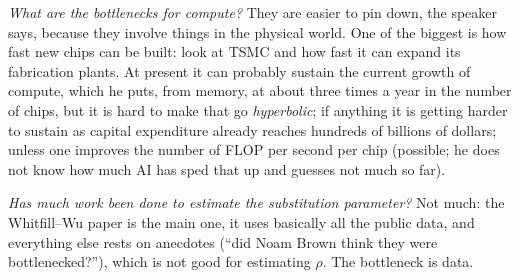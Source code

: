 \begin{discussion}
\emph{What are the bottlenecks for compute?} They are easier to pin down, the speaker says, because they involve things in the physical world. One of the biggest is how fast new chips can be built: look at TSMC and how fast it can expand its fabrication plants. At present it can probably sustain the current growth of compute, which he puts, from memory, at about three times a year in the number of chips\flag, but it is hard to make that go \emph{hyperbolic}; if anything it is getting harder to sustain as capital expenditure already reaches hundreds of billions of dollars; unless one improves the number of FLOP per second per chip (possible; he does not know how much AI has sped that up and guesses not much so far).


\emph{Has much work been done to estimate the substitution parameter?} Not much: the Whitfill--Wu paper is the main one, it uses basically all the public data, and everything else rests on anecdotes (``did Noam Brown think they were bottlenecked?''), which is not good for estimating $\rho$. The bottleneck is data.
\end{discussion}

